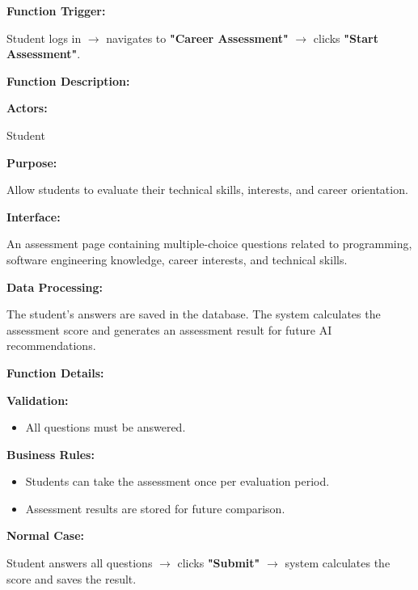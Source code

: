 \textbf{Function Trigger:}

Student logs in $\rightarrow$ navigates to \textbf{"Career Assessment"} $\rightarrow$ clicks \textbf{"Start Assessment"}.

\vspace{0.3cm}

\textbf{Function Description:}

\textbf{Actors:}

Student

\vspace{0.2cm}

\textbf{Purpose:}

Allow students to evaluate their technical skills, interests, and career orientation.

\vspace{0.2cm}

\textbf{Interface:}

An assessment page containing multiple-choice questions related to programming, software engineering knowledge, career interests, and technical skills.

\vspace{0.2cm}

\textbf{Data Processing:}

The student's answers are saved in the database. The system calculates the assessment score and generates an assessment result for future AI recommendations.

\vspace{0.3cm}

\textbf{Function Details:}

\textbf{Validation:}

\begin{itemize}
\item All questions must be answered.
\end{itemize}

\textbf{Business Rules:}

\begin{itemize}
\item Students can take the assessment once per evaluation period.
\item Assessment results are stored for future comparison.
\end{itemize}

\textbf{Normal Case:}

Student answers all questions $\rightarrow$ clicks \textbf{"Submit"} $\rightarrow$ system calculates the score and saves the result.

